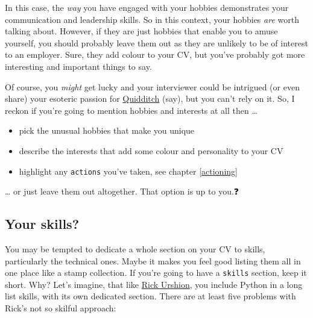 \documentclass[
]{book}
\providecommand{\tightlist}{%
  \setlength{\itemsep}{0pt}\setlength{\parskip}{0pt}}
\begin{document}
In this case, the \emph{way} you have engaged with your hobbies demonstrates your communication and leadership skills. So in this context, your hobbies \emph{are} worth talking about. However, if they are just hobbies that enable you to amuse yourself, you should probably leave them out as they are unlikely to be of interest to an employer. Sure, they add colour to your CV, but you've probably got more interesting and important things to say.

Of course, you \emph{might} get lucky and your interviewer could be intrigued (or even share) your esoteric passion for \href{https://en.wikipedia.org/wiki/Quidditch_(real-life_sport)}{Quidditch} (say), but you can't rely on it. So, I reckon if you're going to mention hobbies and interests at all then \ldots{}

\begin{itemize}
\tightlist
\item
  pick the unusual hobbies that make you unique
\item
  describe the interests that add some colour and personality to your CV
\item
  highlight any \texttt{actions} you've taken, see chapter \ref{actioning}
\end{itemize}

\ldots{} or just leave them out altogether. That option is up to you.❓

\hypertarget{mycvsk}{%
\subsection{Your skills?}\label{mycvsk}}

You may be tempted to dedicate a whole section on your CV to skills, particularly the technical ones. Maybe it makes you feel good listing them all in one place like a stamp collection. If you're going to have a \texttt{skills} section, keep it short. Why? Let's imagine, that like \href{Rick_Urshion.pdf}{Rick Urshion}, you include Python in a long list skills, with its own dedicated section. There are at least five problems with Rick's not so skilful approach:
\end{document}
